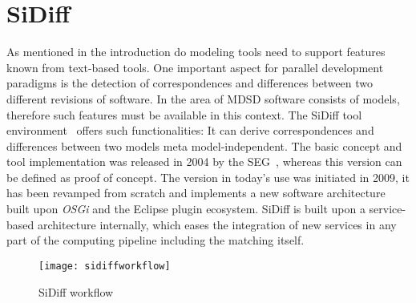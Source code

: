 \section{SiDiff}\label{environment_and_tools:sidiff}
As mentioned in the introduction do modeling tools need to support features
known from text-based tools. One important aspect for parallel development
paradigms is the detection of correspondences and differences between two
different revisions of software. In the area of \ac{MDSD} 
software consists of models, therefore such features must be available in this
context. The SiDiff tool environment~\cite{SiDiffURL} offers such
functionalities: It can derive correspondences and differences between two
models meta model-independent. The basic concept and tool implementation was
released in 2004 by the \ac{SEG}~\cite{SEGURL}, whereas this version can be
defined as proof of concept. The version in today's use was initiated in 2009,
it has been revamped from scratch and implements a new software architecture
built upon \textit{OSGi} and the Eclipse plugin ecosystem. SiDiff is built upon
a service-based architecture internally, which eases the integration of new
services in any part of the computing pipeline including the matching itself.
\newpage
\begin{figure}[h!]
\begin{center}
\texttt{[image: sidiffworkflow]}\\
\end{center}
\caption{SiDiff workflow~\cite{SiDiffURL}}
\label{sidiffworkflow}
\end{figure}

